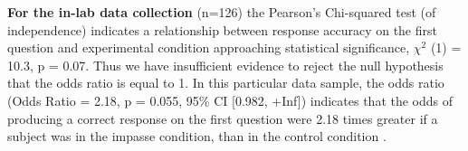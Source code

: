\documentclass[
  letterpaper,
  DIV=11,
  numbers=noendperiod]{scrreprt}
\newenvironment{Shaded}{\begin{snugshade}}{\end{snugshade}}
\newcommand{\AttributeTok}[1]{\textcolor[rgb]{0.40,0.45,0.13}{#1}}
\newcommand{\ConstantTok}[1]{\textcolor[rgb]{0.56,0.35,0.01}{#1}}
\newcommand{\DecValTok}[1]{\textcolor[rgb]{0.68,0.00,0.00}{#1}}
\newcommand{\FunctionTok}[1]{\textcolor[rgb]{0.28,0.35,0.67}{#1}}
\newcommand{\NormalTok}[1]{\textcolor[rgb]{0.00,0.23,0.31}{#1}}
\newcommand{\OtherTok}[1]{\textcolor[rgb]{0.00,0.23,0.31}{#1}}
\newcommand{\SpecialCharTok}[1]{\textcolor[rgb]{0.37,0.37,0.37}{#1}}
\newcommand{\StringTok}[1]{\textcolor[rgb]{0.13,0.47,0.30}{#1}}
\begin{document}
\textbf{For the in-lab data collection} (n=126) the Pearson's
Chi-squared test (of independence) indicates a relationship between
response accuracy on the first question and experimental condition
approaching statistical significance, \(\chi^2\) (1) = 10.3, p = 0.07.
Thus we have insufficient evidence to reject the null hypothesis that
the odds ratio is equal to 1. In this particular data sample, the odds
ratio (Odds Ratio = 2.18, p = 0.055, 95\% CI {[}0.982, +Inf{]})
indicates that the odds of producing a correct response on the first
question were 2.18 times greater if a subject was in the impasse
condition, than in the control condition .

\begin{Shaded}
\end{Shaded}
\end{document}
